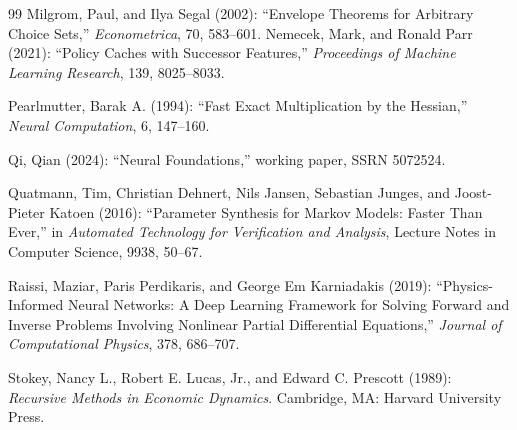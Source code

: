 \begin{thebibliography}{99}
Milgrom, Paul, and Ilya Segal (2002): ``Envelope Theorems for Arbitrary Choice Sets,'' \emph{Econometrica}, 70, 583--601.
Nemecek, Mark, and Ronald Parr (2021): ``Policy Caches with Successor Features,'' \emph{Proceedings of Machine Learning Research}, 139, 8025--8033.

Pearlmutter, Barak A. (1994): ``Fast Exact Multiplication by the Hessian,'' \emph{Neural Computation}, 6, 147--160.

Qi, Qian (2024): ``Neural Foundations,'' working paper, SSRN 5072524.

Quatmann, Tim, Christian Dehnert, Nils Jansen, Sebastian Junges, and Joost-Pieter Katoen (2016): ``Parameter Synthesis for Markov Models: Faster Than Ever,'' in \emph{Automated Technology for Verification and Analysis}, Lecture Notes in Computer Science, 9938, 50--67.

Raissi, Maziar, Paris Perdikaris, and George Em Karniadakis (2019): ``Physics-Informed Neural Networks: A Deep Learning Framework for Solving Forward and Inverse Problems Involving Nonlinear Partial Differential Equations,'' \emph{Journal of Computational Physics}, 378, 686--707.

Stokey, Nancy L., Robert E. Lucas, Jr., and Edward C. Prescott (1989): \emph{Recursive Methods in Economic Dynamics}. Cambridge, MA: Harvard University Press.

\par
\end{thebibliography}
